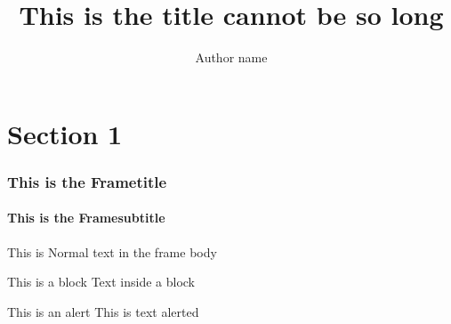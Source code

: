 \documentclass[aspectratio=169]{beamer}
\title{This is the title cannot be so long}
\author{Author name}
\begin{document}
\titlepage


\section{Section 1}

\begin{frame}
	\frametitle{This is the Frametitle}
	\framesubtitle{This is the Framesubtitle}
	This is Normal text in the frame body
	
	\begin{block}{This is a block}
		Text inside a block
	\end{block}
	
	\begin{alertblock}{This is an alert}
		This is text alerted
	\end{alertblock}
\end{frame}
\end{document}
